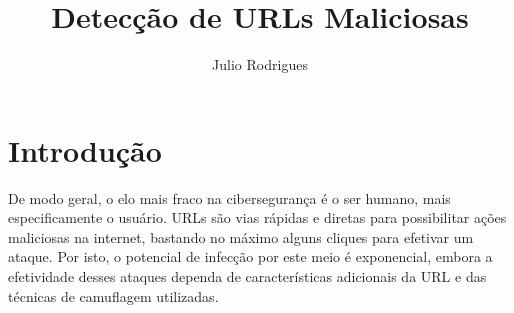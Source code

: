 \documentclass[manuscript,screen,review]{acmart}
\begin{document}
\title{Detecção de URLs Maliciosas}

\author{Julio Rodrigues}

\renewcommand{\shortauthors}{Rodrigues, J.}





\maketitle

\section{Introdução}

De modo geral, o elo mais fraco na cibersegurança é o ser humano, mais especificamente o usuário. URLs são vias rápidas e diretas para possibilitar ações maliciosas na internet, bastando no máximo alguns cliques para efetivar um ataque. Por isto, o potencial de infecção por este meio é exponencial, embora a efetividade desses ataques dependa de características adicionais da URL e das técnicas de camuflagem utilizadas.
\end{document}
